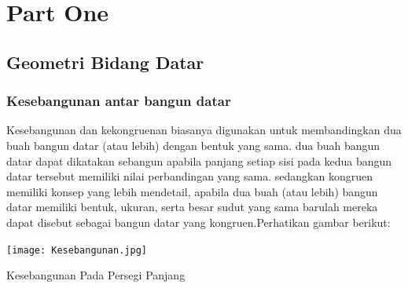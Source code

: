 \documentclass[11pt,fleqn]{book} %
\begin{document}


\pagestyle{empty} %

\tableofcontents %

\cleardoublepage %

\pagestyle{fancy} %


\part{Part One}



\chapter{Geometri Bidang Datar}
\section{Kesebangunan antar bangun datar}


Kesebangunan dan kekongruenan biasanya digunakan untuk membandingkan dua buah bangun datar (atau lebih) dengan bentuk yang sama. dua buah bangun datar dapat dikatakan sebangun apabila panjang setiap sisi pada kedua bangun datar tersebut memiliki nilai perbandingan yang sama. sedangkan kongruen memiliki konsep yang lebih mendetail, apabila dua buah (atau lebih) bangun datar memiliki bentuk, ukuran, serta besar sudut yang sama barulah mereka dapat disebut sebagai bangun datar yang kongruen.Perhatikan gambar berikut:

\texttt{[image: Kesebangunan.jpg]}


Kesebangunan Pada Persegi Panjang
\end{document}
